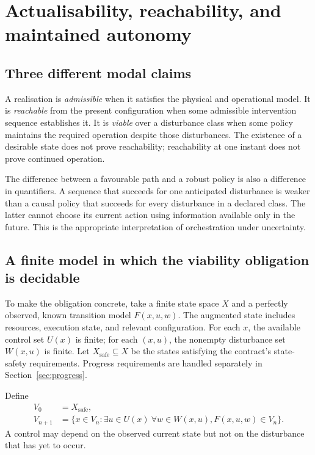 \documentclass[11pt,a4paper]{article}
\theoremstyle{definition}
\theoremstyle{remark}
\begin{document}
\section{Actualisability, reachability, and maintained autonomy}\label{sec:viability}
\subsection{Three different modal claims}
A realisation is \emph{admissible} when it satisfies the physical and operational model. It is \emph{reachable} from the present configuration when some admissible intervention sequence establishes it. It is \emph{viable} over a disturbance class when some policy maintains the required operation despite those disturbances. The existence of a desirable state does not prove reachability; reachability at one instant does not prove continued operation.

The difference between a favourable path and a robust policy is also a difference in quantifiers. A sequence that succeeds for one anticipated disturbance is weaker than a causal policy that succeeds for every disturbance in a declared class. The latter cannot choose its current action using information available only in the future. This is the appropriate interpretation of orchestration under uncertainty.

\subsection{A finite model in which the viability obligation is decidable}
To make the obligation concrete, take a finite state space $X$ and a perfectly observed, known transition model $F(x,u,w)$. The augmented state includes resources, execution state, and relevant configuration. For each $x$, the available control set $U(x)$ is finite; for each $(x,u)$, the nonempty disturbance set $W(x,u)$ is finite. Let $X_{\mathrm{safe}}\subseteq X$ be the states satisfying the contract's state-safety requirements. Progress requirements are handled separately in Section~\ref{sec:progress}.

Define
\begin{align}
 V_0&=X_{\mathrm{safe}},\label{eq:V0}\\
 V_{n+1}&=\{x\in V_n:\exists u\in U(x)\ \forall w\in W(x,u),
                       F(x,u,w)\in V_n\}.\label{eq:viability}
\end{align}
A control may depend on the observed current state but not on the disturbance that has yet to occur.
\end{document}
